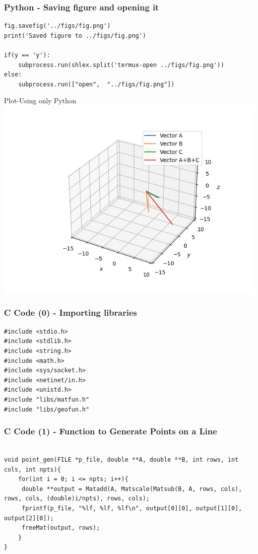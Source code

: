 \documentclass{beamer}
\begin{document}
\begin{frame}[fragile]
    \frametitle{Python - Saving figure and opening it}
    \begin{lstlisting}
fig.savefig('../figs/fig.png')
print('Saved figure to ../figs/fig.png')

if(y == 'y'):
    subprocess.run(shlex.split('termux-open ../figs/fig.png'))
else:
    subprocess.run(["open",  "../figs/fig.png"])
    \end{lstlisting}
\end{frame}


\begin{frame}{Plot-Using only Python}
    \centering
    \includegraphics[width=\columnwidth, height=0.8\textheight, keepaspectratio]{../figs/fig.png}     
\end{frame}

\begin{frame}[fragile]
    \frametitle{C Code (0) - Importing libraries}

    \begin{lstlisting}
#include <stdio.h>
#include <stdlib.h>
#include <string.h>
#include <math.h>
#include <sys/socket.h>
#include <netinet/in.h>
#include <unistd.h>
#include "libs/matfun.h"
#include "libs/geofun.h"
    \end{lstlisting}
\end{frame}
\begin{frame}[fragile]
    \frametitle{C Code (1) - Function to Generate Points on a Line}

    \begin{lstlisting}

void point_gen(FILE *p_file, double **A, double **B, int rows, int cols, int npts){
    for(int i = 0; i <= npts; i++){
     double **output = Matadd(A, Matscale(Matsub(B, A, rows, cols), rows, cols, (double)i/npts), rows, cols);
     fprintf(p_file, "%lf, %lf, %lf\n", output[0][0], output[1][0], output[2][0]);
     freeMat(output, rows);
    }
}

    \end{lstlisting}
\end{frame}
\end{document}
